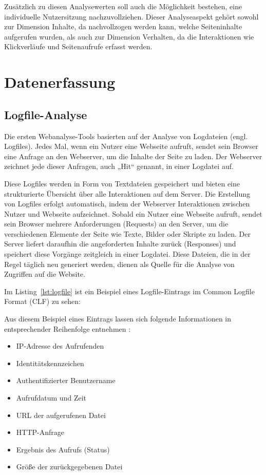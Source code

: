 Zusätzlich zu diesen Analysewerten soll auch die Möglichkeit bestehen, eine individuelle Nutzersitzung nachzuvollziehen. Dieser Analyseaspekt gehört sowohl zur Dimension Inhalte, da nachvollzogen werden kann, welche Seiteninhalte aufgerufen wurden, als auch zur Dimension Verhalten, da die Interaktionen wie Klickverläufe und Seitenaufrufe erfasst werden.

\section{Datenerfassung}
\label{sec:Datenerfassung}
\subsection{Logfile-Analyse}
Die ersten Webanalyse-Tools basierten auf der Analyse von Logdateien (engl. Logfiles). Jedes Mal, wenn ein Nutzer eine Webseite aufruft, sendet sein Browser eine Anfrage an den Webserver, um die Inhalte der Seite zu laden. Der Webserver zeichnet jede dieser Anfragen, auch „Hit“ genannt, in einer Logdatei auf. \parencite[S.8]{Dykes2014}

Diese Logfiles werden in Form von Textdateien gespeichert und bieten eine strukturierte Übersicht über alle Interaktionen auf dem Server. Die Erstellung von Logfiles erfolgt automatisch, indem der Webserver Interaktionen zwischen Nutzer und Webseite aufzeichnet. Sobald ein Nutzer eine Webseite aufruft, sendet sein Browser mehrere Anforderungen (Requests) an den Server, um die verschiedenen Elemente der Seite wie Texte, Bilder oder Skripte zu laden. Der Server liefert daraufhin die angeforderten Inhalte zurück (Responses) und speichert diese Vorgänge zeitgleich in einer Logdatei. Diese Dateien, die in der Regel täglich neu generiert werden, dienen als Quelle für die Analyse von Zugriffen auf die Website. \parencite[Kap.2.2]{Hassler2019}

Im Listing~\ref{lst:logfile} ist ein Beispiel eines Logfile-Eintrags im Common Logfile Format (CLF) zu sehen:



Aus diesem Beispiel eines Eintrags lassen sich folgende Informationen in entsprechender Reihenfolge entnehmen \parencite{ApacheLogFiles}: \\


\begin{itemize}
    \item IP-Adresse des Aufrufenden
    \item Identitätskennzeichen
    \item Authentifizierter Benutzername
    \item Aufrufdatum und Zeit
    \item URL der aufgerufenen Datei
    \item HTTP-Anfrage
    \item Ergebnis des Aufrufs (Status)
    \item Größe der zurückgegebenen Datei
\end{itemize}

